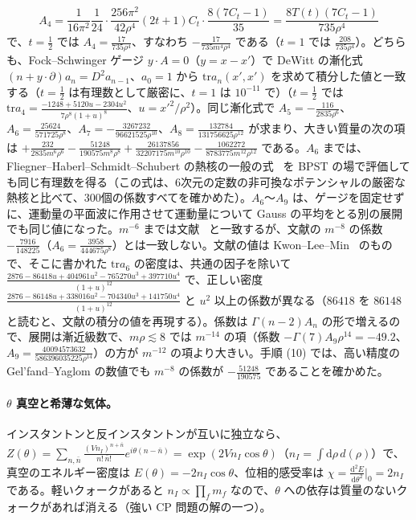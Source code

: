 \documentclass[a4paper,10pt]{ltjsarticle}
\newcommand{\dd}{\mathrm{d}}
\newcommand{\tr}{\mathrm{tr}}
\begin{document}
\begin{equation*}
A_4=\frac1{16\pi^2}\frac1{24}\cdot\frac{256\pi^2}{42\rho^4}(2t+1)C_t\cdot\frac{8(7C_t-1)}{35}=\frac{8T(t)(7C_t-1)}{735\rho^4}
\end{equation*}
で、$t=\frac12$ では $A_4=\frac{17}{735\rho^4}$、すなわち $-\frac{17}{735m^4\rho^4}$ である（$t=1$ では $\frac{208}{735\rho^4}$）。どちらも、Fock--Schwinger ゲージ $y\cdot A=0$（$y=x-x'$）で DeWitt の漸化式 $(n+y\cdot\partial)a_n=D^2a_{n-1}$、$a_0=1$ から $\tr a_n(x',x')$ を求めて積分した値と一致する（$t=\frac12$ は有理数として厳密に、$t=1$ は $10^{-11}$ で）（$t=\frac12$ では $\tr a_4=\frac{-1248+5120u-2304u^2}{7\rho^8(1+u)^8}$、$u=x'^2/\rho^2$）。同じ漸化式で $A_5=-\frac{116}{2835\rho^6}$、$A_6=\frac{25624}{571725\rho^8}$、$A_7=-\frac{3267232}{96621525\rho^{10}}$、$A_8=\frac{132784}{131756625\rho^{12}}$ が求まり、大きい質量の次の項は $+\frac{232}{2835m^6\rho^6}-\frac{51248}{190575m^8\rho^8}+\frac{26137856}{32207175m^{10}\rho^{10}}-\frac{1062272}{8783775m^{12}\rho^{12}}$ である。$A_6$ までは、Fliegner--Haberl--Schmidt--Schubert の熱核の一般の式~\cite{fhss98} を BPST の場で評価しても同じ有理数を得る（この式は、6次元の定数の非可換なポテンシャルの厳密な熱核と比べて、300個の係数すべてを確かめた）。$A_6$〜$A_9$ は、ゲージを固定せずに、運動量の平面波に作用させて運動量について Gauss の平均をとる別の展開でも同じ値になった。$m^{-6}$ までは文献~\cite{dhlm05b} と一致するが、文献の $m^{-8}$ の係数 $-\frac{7916}{148225}$（$A_6=\frac{3958}{444675\rho^8}$）とは一致しない。文献の値は Kwon--Lee--Min~\cite{klm00} のもので、そこに書かれた $\tr a_6$ の密度は、共通の因子を除いて $\frac{2876-86418u+404961u^2-765270u^3+397710u^4}{(1+u)^{12}}$ で、正しい密度 $\frac{2876-86148u+338016u^2-704340u^3+141750u^4}{(1+u)^{12}}$ と $u^2$ 以上の係数が異なる（$86418$ を $86148$ と読むと、文献の積分の値を再現する）。係数は $\Gamma(n-2)A_n$ の形で増えるので、展開は漸近級数で、$m\rho\lesssim8$ では $m^{-14}$ の項（係数 $-\Gamma(7)A_9\rho^{14}=-49.2$、$A_9=\frac{40094573632}{586396035225\rho^{14}}$）の方が $m^{-12}$ の項より大きい。手順 (10) では、高い精度の Gel'fand--Yaglom の数値でも $m^{-8}$ の係数が $-\frac{51248}{190575}$ であることを確かめた。

\paragraph{$\theta$ 真空と希薄な気体。}インスタントンと反インスタントンが互いに独立なら、$Z(\theta)=\sum_{n,\bar n}\frac{(Vn_I)^{n+\bar n}}{n!\,\bar n!}e^{i\theta(n-\bar n)}=\exp(2Vn_I\cos\theta)$（$n_I=\int\dd\rho\,d(\rho)$）で、真空のエネルギー密度は $E(\theta)=-2n_I\cos\theta$、位相的感受率は $\chi=\frac{\dd^2E}{\dd\theta^2}|_0=2n_I$ である。軽いクォークがあると $n_I\propto\prod_fm_f$ なので、$\theta$ への依存は質量のないクォークがあれば消える（強い CP 問題の解の一つ）。
\end{document}
